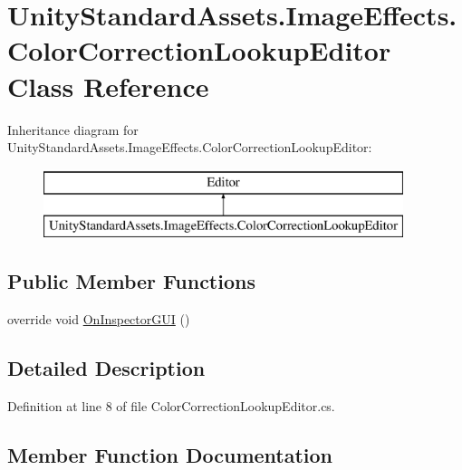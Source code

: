 \hypertarget{class_unity_standard_assets_1_1_image_effects_1_1_color_correction_lookup_editor}{}\section{Unity\+Standard\+Assets.\+Image\+Effects.\+Color\+Correction\+Lookup\+Editor Class Reference}
\label{class_unity_standard_assets_1_1_image_effects_1_1_color_correction_lookup_editor}
Inheritance diagram for Unity\+Standard\+Assets.\+Image\+Effects.\+Color\+Correction\+Lookup\+Editor\+:\begin{figure}[H]
\begin{center}
\leavevmode
\includegraphics[height=2.000000cm]{class_unity_standard_assets_1_1_image_effects_1_1_color_correction_lookup_editor}
\end{center}
\end{figure}
\subsection*{Public Member Functions}
\begin{DoxyCompactItemize}
\item 
override void \mbox{\hyperlink{class_unity_standard_assets_1_1_image_effects_1_1_color_correction_lookup_editor_aba10ca5143357b23a5f7305740f10e74}{On\+Inspector\+G\+UI}} ()
\end{DoxyCompactItemize}


\subsection{Detailed Description}


Definition at line 8 of file Color\+Correction\+Lookup\+Editor.\+cs.



\subsection{Member Function Documentation}
\mbox{\label{class_unity_standard_assets_1_1_image_effects_1_1_color_correction_lookup_editor_aba10ca5143357b23a5f7305740f10e74}} 
